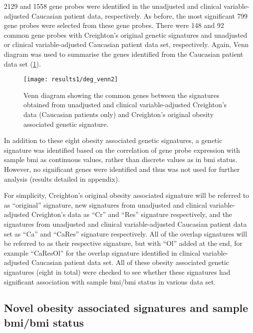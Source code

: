 2129 and 1558 gene probes were identified in the unadjusted and clinical variable-adjusted Caucasian patient data, respectively.
As before, the most significant 799 gene probes were selected from these gene probes.
There were 148 and 92 common gene probes with Creighton's original genetic signatures and unadjusted or clinical variable-adjusted Caucasian patient data set, respectively.
Again, Venn diagram was used to summarise the genes identified from the Caucasian patient data set (\cref{fig:venn2}).
\\

\begin{figure}[htp!]
	\centering
	\texttt{[image: results1/deg\_venn2]}
	\caption[Summary of the \glspl{deg} identified from Creighton's data (Caucasian patient data)]{Venn diagram showing the common genes between the signatures obtained from unadjusted and clinical variable-adjusted Creighton's data (Caucasian patients only) and Creighton's original obesity associated genetic signature.}
	\label{fig:venn2}
\end{figure}

\noindent
In addition to these eight obesity associated genetic signatures, a genetic signature was identified based on the correlation of gene probe expression with sample \gls{bmi} as continuous values, rather than discrete values as in \gls{bmi} status.
However, no significant genes were identified and thus was not used for further analysis (results detailed in appendix).

For simplicity, Creighton's original obesity associated signature will be referred to as ``original'' signature, new signatures from unadjusted and clinical variable-adjusted Creighton's data as ``Cr'' and ``Res'' signature respectively, and the signatures from unadjusted and clinical variable-adjusted Caucasian patient data set as ``Ca'' and ``CaRes'' signature respectively.
All of the overlap signatures will be referred to as their respective signature, but with ``Ol'' added at the end, for example ``CaResOl'' for the overlap signature identified in clinical variable-adjusted Caucasian patient data set.
All of these obesity associated genetic signatures (eight in total) were checked to see whether these signatures had significant association with sample \gls{bmi}/\gls{bmi} status in various data set.

\subsection{Novel obesity associated signatures and sample \gls{bmi}/\gls{bmi} status}
\label{sub:_novel_obesity_associated_signatures_and_sample_bmi}

